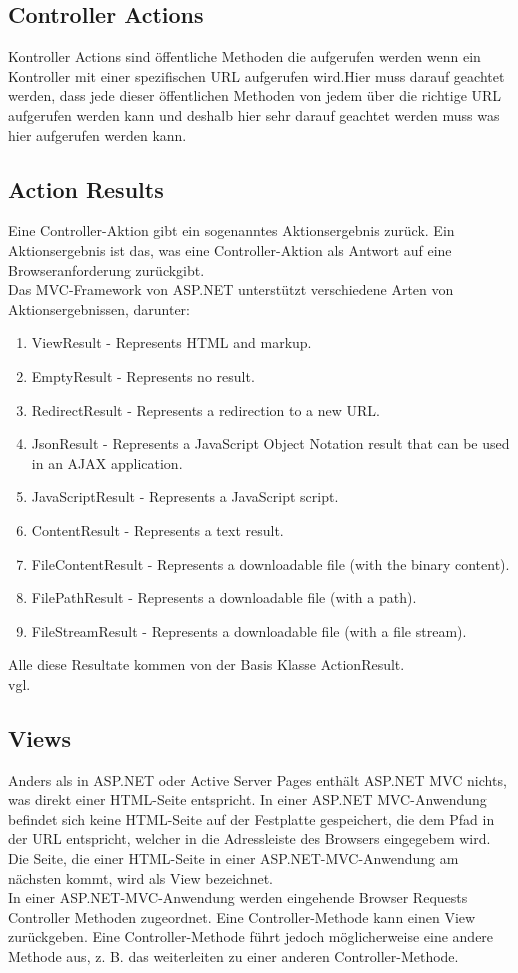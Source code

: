 {\subsection{Controller Actions}
\label{sec:controller_actions}
Kontroller Actions sind öffentliche Methoden die aufgerufen werden wenn ein Kontroller mit einer spezifischen URL aufgerufen wird.Hier muss darauf geachtet werden, dass jede dieser öffentlichen Methoden von jedem über die richtige URL aufgerufen werden kann und deshalb hier sehr darauf geachtet werden muss was hier aufgerufen werden kann. 
\subsection{Action Results}
\label{sec:controller_actions_results}
Eine Controller-Aktion gibt ein sogenanntes Aktionsergebnis zurück. Ein Aktionsergebnis ist das, was eine Controller-Aktion als Antwort auf eine Browseranforderung zurückgibt.\\Das MVC-Framework von ASP.NET unterstützt verschiedene Arten von Aktionsergebnissen, darunter:
\begin{enumerate}
\item ViewResult - Represents HTML and markup.
\item EmptyResult - Represents no result.
\item RedirectResult - Represents a redirection to a new URL.
\item JsonResult - Represents a JavaScript Object Notation result that can be used in an AJAX application.
\item JavaScriptResult - Represents a JavaScript script.
\item ContentResult - Represents a text result.
\item FileContentResult - Represents a downloadable file (with the binary content).
\item FilePathResult - Represents a downloadable file (with a path).
\item FileStreamResult - Represents a downloadable file (with a file stream).
\end{enumerate}
Alle diese Resultate kommen von der Basis Klasse ActionResult.
\\ vgl. \textcite{mic_controller}
\subsection{Views}
\label{sec:Views}
Anders als in ASP.NET oder Active Server Pages enthält ASP.NET MVC nichts, was direkt einer HTML-Seite entspricht. In einer ASP.NET MVC-Anwendung befindet sich keine HTML-Seite auf der Festplatte gespeichert, die dem Pfad in der URL entspricht, welcher in die Adressleiste des Browsers eingegebem wird. Die Seite, die einer HTML-Seite in einer ASP.NET-MVC-Anwendung am nächsten kommt, wird als View bezeichnet.\\
In einer ASP.NET-MVC-Anwendung werden eingehende Browser Requests Controller Methoden zugeordnet. Eine Controller-Methode kann einen View zurückgeben. Eine Controller-Methode führt jedoch möglicherweise eine andere Methode aus, z. B. das weiterleiten zu einer anderen Controller-Methode.
}
